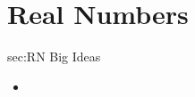 \chapter{Real Numbers}
\label{chap:RN}

\begin{bigideas}{sec:RN Big Ideas}
\begin{itemize}
  \item 
\end{itemize}
\end{bigideas}